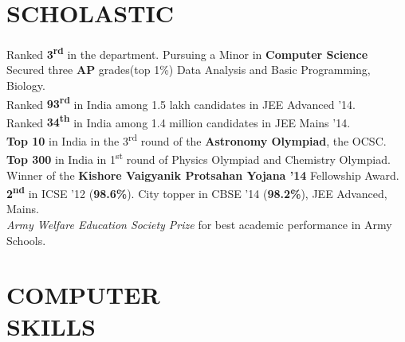 \documentclass[margin, 10pt]{res} %
\begin{document}



\begin{resume}
\vspace*{17mm}
 
\section{SCHOLASTIC}  

Ranked \textbf{3\textsuperscript{rd}} in the department. Pursuing a Minor in \textbf{Computer Science}\\
Secured three \textbf{AP} grades(top 1\%) Data Analysis and Basic Programming, Biology.\\
Ranked \textbf{93\textsuperscript{rd}} in India among 1.5 lakh candidates in JEE Advanced '14.\\
Ranked \textbf{34\textsuperscript{th}} in India among 1.4 million candidates in JEE Mains '14.\\
\textbf{Top 10} in India in the 3\textsuperscript{rd} round of the \textbf{Astronomy Olympiad}, the OCSC.\\
\textbf{Top 300} in India in 1\textsuperscript{st} round of Physics Olympiad and Chemistry Olympiad.\\
Winner of the \textbf{Kishore Vaigyanik Protsahan Yojana '14} Fellowship Award.\\
\textbf{2\textsuperscript{nd}} in ICSE '12 (\textbf{98.6\%}). City topper in  CBSE '14 (\textbf{98.2\%}), JEE Advanced, Mains.\\
\textit{Army Welfare Education Society Prize} for best academic performance in Army Schools.

 

\section{COMPUTER \\ SKILLS} 


\end{resume}
\end{document}
